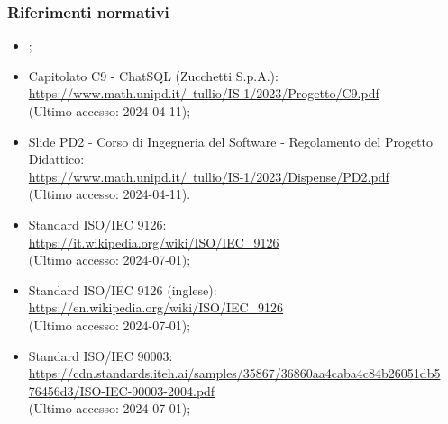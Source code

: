 \subsubsection{Riferimenti normativi}
\begin{itemize}
  \item \NormeDiProgetto;
  \item Capitolato C9 - ChatSQL (Zucchetti S.p.A.): \\ \href{https://www.math.unipd.it/~tullio/IS-1/2023/Progetto/C9.pdf}{https://www.math.unipd.it/~tullio/IS-1/2023/Progetto/C9.pdf} \\ (Ultimo accesso: 2024-04-11);
  \item Slide PD2 - Corso di Ingegneria del Software - Regolamento del Progetto Didattico: \\ \href{https://www.math.unipd.it/~tullio/IS-1/2023/Dispense/PD2.pdf}{https://www.math.unipd.it/~tullio/IS-1/2023/Dispense/PD2.pdf} \\ (Ultimo accesso: 2024-04-11).
  \item Standard ISO/IEC 9126: \\ \href{https://it.wikipedia.org/wiki/ISO/IEC_9126}{https://it.wikipedia.org/wiki/ISO/IEC\_9126}  \\ (Ultimo accesso: 2024-07-01);
  \item Standard ISO/IEC 9126 (inglese): \\ \href{https://en.wikipedia.org/wiki/ISO/IEC_9126}{https://en.wikipedia.org/wiki/ISO/IEC\_9126}  \\ (Ultimo accesso: 2024-07-01);
  \item Standard ISO/IEC 90003: \\ \href{https://cdn.standards.iteh.ai/samples/35867/36860aa4caba4c84b26051db576456d3/ISO-IEC-90003-2004.pdf}{https://cdn.standards.iteh.ai/samples/35867/36860aa4caba4c84b26051db5 \- 76456d3/ISO-IEC-90003-2004.pdf}  \\ (Ultimo accesso: 2024-07-01);
\end{itemize}

